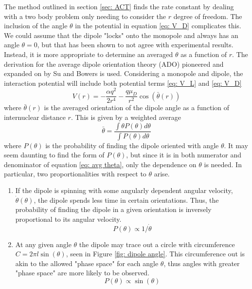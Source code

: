 The method outlined in section \ref{sec: ACT} finds the rate constant by dealing with a two body problem only needing to consider the $r$ degree of freedom. The inclusion of the angle $\theta$ in the potential in equation \ref{eq: V_D} complicates this. We could assume that the dipole "locks" onto the monopole and always has an angle $\theta=0$, but that has been shown to not agree with experimental results.\cite{Su1973a} Instead, it is more appropriate to determine an averaged $\theta$ as a function of $r$. The derivation for the average dipole orientation theory (ADO) pioneered and expanded on by Su and Bowers is used.\cite{Su1973, Su1973a} Considering a monopole and dipole, the interaction potential will include both potential terms \ref{eq: V_L} and \ref{eq: V_D}
\begin{equation}
    V(r) = -\frac{\alpha q^2}{2r^4} - \frac{q\mu_D}{r^2} \cos\left(\bar{\theta}(r)\right)
    \label{eq: V_L+V_D}
\end{equation}
where $\bar{\theta}(r)$ is the averaged orientation of the dipole angle as a function of internuclear distance $r$. This is given by a weighted average
\begin{equation}
	\bar{\theta} = \dfrac{\int \theta P(\theta) d\theta}{\int P(\theta) d\theta} \label{eq: avg theta}
\end{equation}
where $P(\theta)$ is the probability of finding the dipole oriented with angle $\theta$. It may seem daunting to find the form of $P(\theta)$, but since it is in both numerator and denominator of equation \ref{eq: avg theta}, only the dependence on $\theta$ is needed. In particular, two proportionalities with respect to $\theta$ arise.
\begin{enumerate}
	\item If the dipole is spinning with some angularly dependent angular velocity, $\dot{\theta}(\theta)$, the dipole spends less time in certain orientations. Thus, the probability of finding the dipole in a given orientation is inversely proportional to its angular velocity.
	\begin{equation}
		P(\theta) \propto 1/\dot{\theta} \label{eq: prop case 1}
	\end{equation}
	\item At any given angle $\theta$ the dipole may trace out a circle with circumference $C = 2\pi l \sin(\theta)$, seen in Figure \ref{fig: dipole angle}. This circumference out is akin to the allowed "phase space" for each angle $\theta$, thus angles with greater "phase space" are more likely to be observed.
	\begin{equation}
		P(\theta) \propto \sin(\theta) \label{eq: prop case 2}
	\end{equation}
\end{enumerate}

